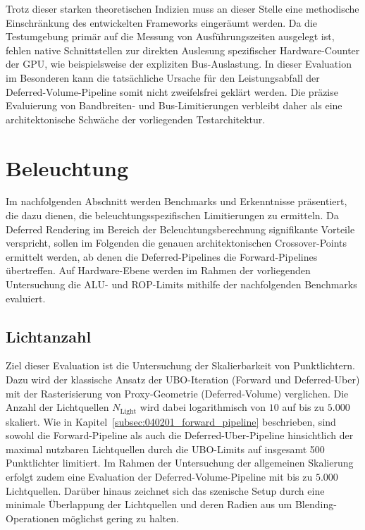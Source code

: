 Trotz dieser starken theoretischen Indizien muss an dieser Stelle eine methodische Einschränkung des entwickelten
Frameworks eingeräumt werden.
Da die Testumgebung primär auf die Messung von Ausführungszeiten ausgelegt ist, fehlen native
Schnittstellen zur direkten Auslesung spezifischer Hardware-Counter der \ac{GPU}, wie beispielsweise der expliziten
Bus-Auslastung.
In dieser Evaluation im Besonderen kann die tatsächliche Ursache für den Leistungsabfall der
Deferred-Volume-Pipeline somit nicht zweifelsfrei geklärt werden.
Die präzise Evaluierung von Bandbreiten- und Bus-Limitierungen verbleibt daher als eine architektonische Schwäche der
vorliegenden Testarchitektur.


\section{{Beleuchtung}}
\label{sec:0504_lighting_eval}

Im nachfolgenden Abschnitt werden Benchmarks und Erkenntnisse präsentiert, die dazu dienen, die beleuchtungsspezifischen
Limitierungen zu ermitteln.
Da Deferred Rendering im Bereich der Beleuchtungsberechnung signifikante Vorteile verspricht, sollen im Folgenden die
genauen architektonischen Crossover-Points ermittelt werden, ab denen die Deferred-Pipelines die Forward-Pipelines
übertreffen.
Auf Hardware-Ebene werden im Rahmen der vorliegenden Untersuchung die \ac{ALU}- und \ac{ROP}-Limits mithilfe der nachfolgenden
Benchmarks evaluiert.

\subsection{{Lichtanzahl}}
\label{subsec:050401_light_count_eval}

Ziel dieser Evaluation ist die Untersuchung der Skalierbarkeit von Punktlichtern.
Dazu wird der klassische Ansatz der \ac{UBO}-Iteration (Forward und Deferred-Uber) mit der Rasterisierung von
Proxy-Geometrie (Deferred-Volume) verglichen.
Die Anzahl der Lichtquellen $N_{\text{Light}}$ wird dabei logarithmisch von $10$ auf bis zu $5.000$ skaliert.
Wie in Kapitel~\ref{subsec:040201_forward_pipeline} beschrieben, sind sowohl die Forward-Pipeline
als auch die Deferred-Uber-Pipeline hinsichtlich der maximal nutzbaren Lichtquellen durch die
\ac{UBO}-Limits auf insgesamt 500 Punktlichter limitiert.
Im Rahmen der Untersuchung der allgemeinen Skalierung erfolgt zudem eine Evaluation der Deferred-Volume-Pipeline mit bis
zu $5.000$ Lichtquellen.
Darüber hinaus zeichnet sich das szenische Setup durch eine minimale Überlappung der Lichtquellen und deren Radien
aus um Blending-Operationen möglichst gering zu halten.

